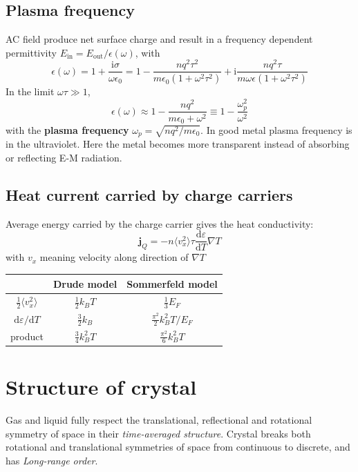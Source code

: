 \documentclass[11pt,letterpaper]{article}
\numberwithin{equation}{section} %
\renewcommand*{\vec}[1]{\bm{#1}}
\newcommand{\dif}{\mathrm d}
\newcommand\mi{\mathrm{i}}
\begin{document}
\subsection{Plasma frequency}
\label{sub:plasma_frequency}
AC field produce net surface charge and result in a frequency dependent
permittivity $E_{\mbox{in}} = E_{\mbox{out}}/\epsilon(\omega)$, with
\begin{equation}
	\epsilon(\omega) = 1 + \frac{\mi\sigma}{\omega\epsilon_0} 
	= 1 - \frac{nq^2\tau^2}{m\epsilon_0(1+\omega^2\tau^2)} +
	\mi\frac{nq^2\tau}{m\omega\epsilon(1+\omega^2\tau^2)}
\end{equation}
In the limit $\omega\tau \gg 1$, 
\begin{equation}
	\epsilon(\omega) \approx 1- \frac{nq^2}{m\epsilon_0+\omega^2} 
	\equiv 1- \frac{\omega_p^2}{\omega^2}
\end{equation}
with the \textbf{plasma frequency} $\omega_p = \sqrt{nq^2/m\epsilon_0}$. 
In good metal plasma frequency is in the ultraviolet. Here the metal becomes
more transparent instead of absorbing or reflecting E-M radiation.

\subsection{Heat current carried by charge carriers}
\label{sub:heat_current_carried_by_charge_carriers}
Average energy carried by the charge carrier gives the heat conductivity: 
\begin{equation}
	\vec j_Q = -n\langle v_x^2\rangle \tau \frac{\dif\varepsilon}{\dif T}\nabla T
\end{equation}
with $v_x$ meaning velocity along direction of $\nabla T$
\begin{center}
\begin{tabular}{c|cc}
                              & Drude model        & Sommerfeld model \\\hline
$\frac12\langle v_x^2\rangle$ & $\frac 12 k_BT$    & $\frac 13 E_F$ \\
$\dif\varepsilon/\dif T$      & $\frac 32 k_B$     & $\frac{\pi^2}2k_B^2T/E_F$ \\
product                       & $\frac 34 k_B^2 T$ &
$\frac{\pi^2}{6}k_B^2T$\\\hline
\end{tabular}
\end{center}

\section{Structure of crystal}
\label{sec:structure_of_crystal}
Gas and liquid fully respect the translational, reflectional and rotational
symmetry of space in their \emph{time-averaged structure}. Crystal breaks
both rotational and translational symmetries of space from continuous to
discrete, and has \emph{Long-range order}. 
\end{document}
